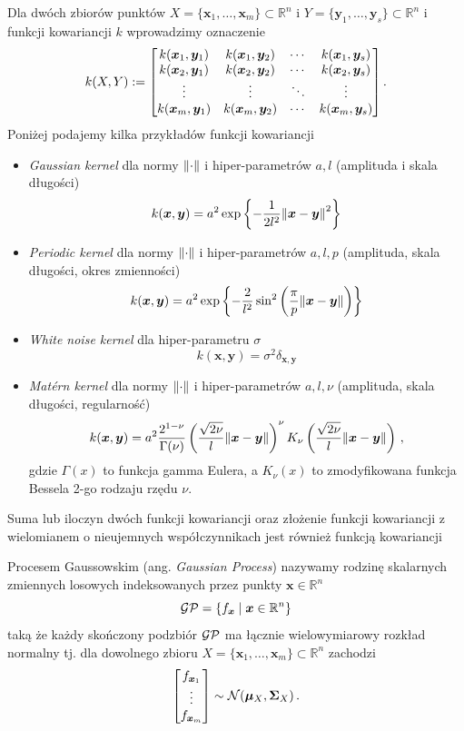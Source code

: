 \documentclass{myclass}
\begin{document}
Dla dwóch zbiorów punktów \(X = \{\bm{x}_1,\ldots,\bm{x}_m\} \subset \mathbb{R}^n\) i \(Y =
\{\bm{y}_1,\ldots,\bm{y}_s\} \subset \mathbb{R}^n\) i funkcji kowariancji \(k\) wprowadzimy
oznaczenie
\[
k(X,Y) := \mqty[k(\bm{x}_1, \bm{y}_1) & k(\bm{x}_1, \bm{y}_2) & \cdots & k(\bm{x}_1, \bm{y}_s)\\
k(\bm{x}_2, \bm{y}_1) & k(\bm{x}_2, \bm{y}_2) & \cdots & k(\bm{x}_2, \bm{y}_s)\\
\vdots & \vdots & \ddots & \vdots\\
k(\bm{x}_m, \bm{y}_1) & k(\bm{x}_m, \bm{y}_2) & \cdots & k(\bm{x}_m, \bm{y}_s)\\]\,.
\]
Poniżej podajemy kilka przykładów funkcji kowariancji
\begin{itemize}
    \item \emph{Gaussian kernel} dla normy \(\norm{\cdot}\) i hiper-parametrów \(a,l\) (amplituda i
    skala długości)
    \[
    k(\bm{x}, \bm{y}) = a^2\exp\left\{-\frac{1}{2l^2}\norm{\bm{x} - \bm{y}}^2\right\}
    \]
    
    \item \emph{Periodic kernel} dla normy \(\norm{\cdot}\) i hiper-parametrów \(a, l, p\)
    (amplituda, skala długości, okres zmienności)
    \[
    k(\bm{x},\bm{y}) = a^2\exp\left\{-\frac{2}{l^2}\sin^2\left(\frac{\pi}{p}\norm{\bm{x} - \bm{y}}\right)\right\}
    \]
    
    \item \emph{White noise kernel} dla hiper-parametru \(\sigma\)
    \[
    k(\bm{x},\bm{y}) = \sigma^2 \delta_{\bm{x},\bm{y}}
    \]
    
    \item \emph{Mat\'ern kernel} dla normy \(\norm{\cdot}\) i hiper-parametrów \(a, l, \nu\)
    (amplituda, skala długości, regularność)
    \[
    k(\bm{x},\bm{y}) = a^2 \frac{2^{1-\nu}}{\Gamma(\nu)}\left(\frac{\sqrt{2\nu}}{l}\norm{\bm{x} - \bm{y}}\right)^\nu K_\nu\left(\frac{\sqrt{2\nu}}{l}\norm{\bm{x} - \bm{y}}\right)\,,
    \]
    gdzie \(\Gamma(x)\) to funkcja gamma Eulera, a \(K_\nu(x)\) to zmodyfikowana funkcja Bessela
    2-go rodzaju rzędu \(\nu\).

\end{itemize}
Suma lub iloczyn dwóch funkcji kowariancji oraz złożenie funkcji kowariancji z wielomianem o
nieujemnych współczynnikach jest również funkcją kowariancji

Procesem Gaussowskim (ang. \emph{Gaussian Process}) nazywamy rodzinę skalarnych zmiennych losowych
indeksowanych przez punkty \(\bm{x} \in \mathbb{R}^n\)
\[
\mathcal{GP} = \left\{f_{\bm{x}} \mid \bm{x} \in \mathbb{R}^n\right\}
\]
taką że każdy skończony podzbiór \(\mathcal{GP}\) ma łącznie wielowymiarowy rozkład normalny tj. dla
dowolnego zbioru \(X = \{\bm{x}_1, \ldots, \bm{x}_m\} \subset \mathbb{R}^n\) zachodzi
\[
\mqty[f_{\bm{x}_1} \\ \vdots \\ f_{\bm{x}_m}] \sim \mc{N}(\bm{\mu}_X, \bm{\Sigma}_{X})\,.
\]
\end{document}
